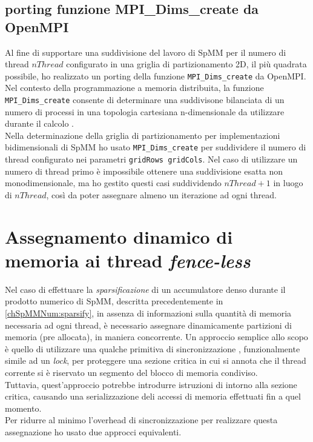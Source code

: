 \subsection{porting funzione MPI\_Dims\_create da OpenMPI}	\label{ompiDimsCreate}
Al fine di supportare una suddivisione del lavoro di SpMM per il numero di thread $nThread$ configurato
in una griglia di partizionamento 2D, il più quadrata possibile, ho realizzato un porting della 
funzione \verb|MPI_Dims_create| da OpenMPI.
\voidLine
Nel contesto della programmazione a memoria distribuita, 
la funzione \\ \verb|MPI_Dims_create| consente di determinare una suddivisone bilanciata di un numero di processi in una topologia 
cartesiana n-dimensionale da utilizzare durante il calcolo \cite{mpi}.\\
Nella determinazione della griglia di partizionamento per implementazioni bidimensionali di SpMM ho usato 
\verb|MPI_Dims_create| per suddividere il numero di thread configurato nei parametri \verb|gridRows gridCols|.
Nel caso di utilizzare un numero di thread primo è impossibile ottenere una suddivisione esatta non monodimensionale,
ma ho gestito questi casi suddividendo $nThread+1$ in luogo di $nThread$, 
così da poter assegnare almeno un iterazione ad ogni thread.\\


\section{Assegnamento dinamico di memoria ai thread \emph{fence-less}} \label{chSpMMAux:atomicSegAssign}
Nel caso di effettuare la \emph{sparsificazione} di un accumulatore denso 
durante il prodotto numerico di SpMM, descritta precedentemente in \ref{chSpMMNum:sparsify},
in assenza di informazioni sulla quantità di memoria necessaria ad ogni thread, 
è necessario assegnare dinamicamente partizioni di memoria (pre allocata), in maniera concorrente.
\voidLine
Un approccio semplice allo scopo è quello di utilizzare una qualche primitiva di sincronizzazione
, funzionalmente simile ad un \emph{lock}, per proteggere una sezione critica in cui
si annota che il thread corrente si è riservato un segmento del blocco di memoria condiviso.\\
Tuttavia, quest'approccio potrebbe introdurre istruzioni di  intorno alla sezione critica,
causando una serializzazione deli accessi di memoria effettuati fin a quel momento.\\
Per ridurre al minimo l'overhead di sincronizzazione per realizzare questa assegnazione
ho usato due approcci equivalenti.

